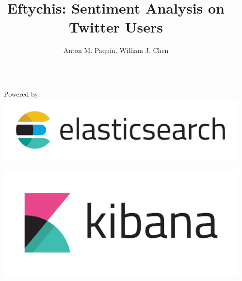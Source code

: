 \documentclass[final]{beamer}
\title{Eftychis: Sentiment Analysis on Twitter Users} %
\author{Anton M. Paquin, William J. Chen} %
\institute{\{paquin,chenwill\}@bu.edu} %
\newlength{\sepwid}
\newlength{\onecolwid}
\begin{document}

\setlength{\belowcaptionskip}{2ex} %
\setlength\belowdisplayshortskip{2ex} %

\begin{frame}[t] %

\begin{columns}[t] %

\begin{column}{\sepwid}\end{column} %

\begin{column}{\onecolwid} %



\begin{block}{Powered by:}
\includegraphics[width=1\linewidth]{Elasticsearch-Logo-Color-H.png} 

\includegraphics[width=0.8\linewidth]{Kibana-Logo-Color-H} 


\end{block}


\end{column}
\end{columns}
\end{frame}
\end{document}
